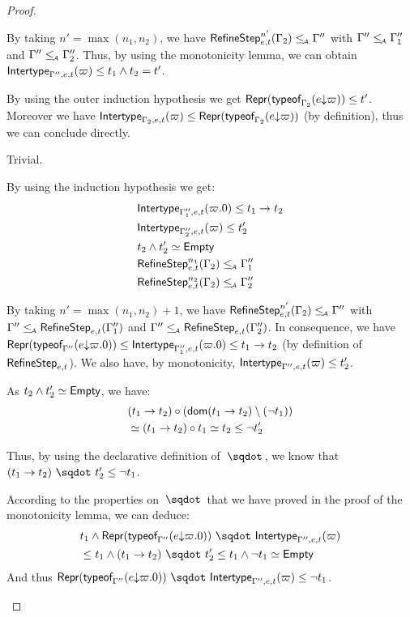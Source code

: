 \documentclass[a4paper]{article}
\theoremstyle{definition}
\begin{document}
\begin{proof}
\begin{description}
\begin{description}
      By taking $n'=\max (n_1,n_2)$,
      we have $\RefineStep {e,t}^{n'} (\Gamma_2) \leqA \Gamma''$ with $\Gamma'' \leqA \Gamma_1''$ and $\Gamma'' \leqA \Gamma_2''$.
      Thus, by using the monotonicity lemma, we can obtain $\env {\Gamma'',e,t} (\varpi) \leq t_1 \land t_2 = t'$.
      \item[\Rule{PTypeof}] By using the outer induction hypothesis we get
      $\tsrep{\tyof {\occ e \varpi} {\Gamma_2}} \leq t'$.
      Moreover we have $\env {\Gamma_2,e,t} (\varpi) \leq \tsrep{\tyof {\occ e \varpi} {\Gamma_2}}$
      (by definition), thus we can conclude directly.
      \item[\Rule{PEps}] Trivial.
       
      \item[\Rule{PAppR}] By using the induction hypothesis we get:
      \begin{align*}
        &\env {\Gamma_1'',e,t} (\varpi.0) \leq \arrow {t_1} {t_2}\\
        &\env {\Gamma_2'',e,t} (\varpi) \leq t_2'\\
        & t_2\land t_2' \simeq \Empty\\
        &\RefineStep {e,t}^{n_1} (\Gamma_2) \leqA \Gamma_1''\\
        &\RefineStep {e,t}^{n_2} (\Gamma_2) \leqA \Gamma_2''
      \end{align*}
      
      By taking $n'=\max (n_1,n_2) + 1$,
      we have $\RefineStep {e,t}^{n'} (\Gamma_2) \leqA \Gamma''$ with $\Gamma'' \leqA \RefineStep {e,t} (\Gamma_1'')$
      and $\Gamma'' \leqA \RefineStep {e,t} (\Gamma_2'')$.
      In consequence, we have $\tsrep{\tyof {\occ e {\varpi.0}} {\Gamma''}} \leq \env {\Gamma_1'',e,t} (\varpi.0) \leq \arrow {t_1} {t_2}$
      (by definition of $\RefineStep {e,t}$).
      We also have, by monotonicity, $\env {\Gamma'',e,t} (\varpi) \leq t_2'$.

      As $t_2\land t_2' \simeq \Empty$, we have:
      \begin{align*}
        &\apply {(\arrow {t_1} {t_2})} {(\dom{\arrow {t_1} {t_2}}\setminus(\neg t_1))}\\
        &\simeq \apply {(\arrow {t_1} {t_2})} {t_1} \simeq t_2 \leq \neg t_2'
      \end{align*}

      Thus, by using the declarative definition of $\worra {} {}$, we know that
      $\worra {(\arrow {t_1} {t_2})} {t_2'} \leq \neg t_1$.

      According to the properties on $\worra {} {}$ that we have proved in the proof of the monotonicity lemma,
      we can deduce:
      \begin{align*}
      &t_1 \land \worra {\tsrep{\tyof {\occ e {\varpi.0}} {\Gamma''}}} {\env {\Gamma'',e,t} (\varpi)}\\
      &\leq t_1 \land \worra {(\arrow {t_1} {t_2})} {t_2'} \leq t_1 \land \neg t_1 \simeq \Empty
      \end{align*}
      And thus $\worra {\tsrep{\tyof {\occ e {\varpi.0}} {\Gamma''}}} {\env {\Gamma'',e,t} (\varpi)} \leq \neg t_1$.


\end{description}
\end{description}
\end{proof}
\end{document}
